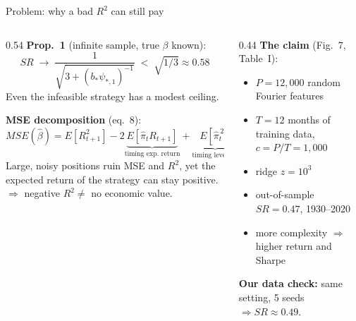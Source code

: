 \documentclass[aspectratio=169,11pt]{beamer}
\newcommand{\hl}[1]{\textcolor{acc}{\textbf{#1}}}
\begin{document}
\begin{frame}{Problem: why a bad $R^2$ can still pay}
\begin{columns}[T]
\begin{column}{0.54\textwidth}
\footnotesize
\hl{Prop.~1} (infinite sample, true $\beta$ known):
\[SR\;\to\;\frac{1}{\sqrt{3+(b_*\psi_{*,1})^{-1}}}\;<\;\sqrt{1/3}\approx0.58\]
Even the infeasible strategy has a modest ceiling.

\medskip
\hl{MSE decomposition} (eq.~8):
\[MSE(\hat\beta)=E[R^2_{t+1}]-2\underbrace{E[\hat\pi_tR_{t+1}]}_{\text{timing exp.\ return}}+\underbrace{E[\hat\pi_t^{\,2}]}_{\text{timing leverage}}\]
Large, noisy positions ruin MSE and $R^2$, yet the expected return of the strategy can stay positive.\\
$\Rightarrow$ negative $R^2\neq$ no economic value.
\end{column}
\begin{column}{0.44\textwidth}
\footnotesize
\hl{The claim} (Fig.~7, Table~I):
\begin{itemize}
\setlength{\itemsep}{4pt}
\item $P=12{,}000$ random Fourier features
\item $T=12$ months of training data, $c=P/T=1{,}000$
\item ridge $z=10^3$
\item out-of-sample $SR=\mathbf{0.47}$, 1930--2020
\item more complexity $\Rightarrow$ higher return and Sharpe
\end{itemize}

\medskip
\hl{Our data check:} same setting, 5 seeds $\Rightarrow SR\approx0.49$.
\end{column}
\end{columns}
\end{frame}

\end{document}
